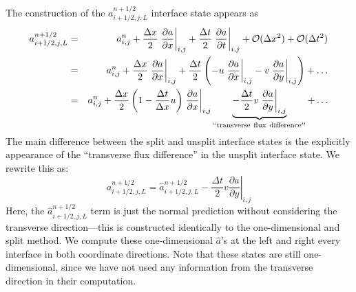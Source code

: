 The construction of the $a_{i+1/2,j,L}^{n+1/2}$ interface state appears as
\begin{eqnarray}
a_{i+1/2,j,L}^{n+1/2} &=& a_{i,j}^n + 
  \frac{\Delta x}{2} \left .\frac{\partial a}{\partial x} \right |_{i,j} + 
  \frac{\Delta t}{2} \left .\frac{\partial a}{\partial t} \right |_{i,j} + 
  \mathcal{O}(\Delta x^2) + \mathcal{O}(\Delta t^2) \nonumber \\
 &=& a_{i,j}^n + 
   \frac{\Delta x}{2} \left .\frac{\partial a}{\partial x} \right |_{i,j} + 
   \frac{\Delta t}{2} \left ( 
   - u \left .\frac{\partial a}{\partial x} \right |_{i,j} 
   - v \left .\frac{\partial a}{\partial y} \right |_{i,j} \right
   ) + \ldots \nonumber \\
    &=& a_{i,j}^n + 
   \frac{\Delta x}{2} \left ( 1 - \frac{\Delta t}{\Delta x} u \right ) 
   \left .\frac{\partial a}{\partial x} \right |_{i,j} \underbrace{-
   \frac{\Delta t}{2} v \left .\frac{\partial a}{\partial y} \right |_{i,j}}_{\mathrm{``transverse~flux~difference''}} +
   \ldots \label{eq:statelu}
\end{eqnarray}
The main difference between the split and unsplit interface states is the
explicitly appearance of the ``transverse flux difference'' in the unsplit
interface state.  We rewrite this as:
\begin{equation}
a_{i+1/2,j,L}^{n+1/2} = \hat{a}_{i+1/2,j,L}^{n+1/2} 
   - \frac{\Delta t}{2} v \left .\frac{\partial a}{\partial y} \right |_{i,j}
\end{equation}
Here, the $\hat{a}_{i+1/2,j,L}^{n+1/2}$ term is just the normal
prediction without considering the transverse direction---this is
constructed identically to the one-dimensional and split method.  We
compute these one-dimensional $\hat{a}$'s at the left and right every
interface in both coordinate directions.  Note that these states are
still one-dimensional, since we have not used any information from the
transverse direction in their computation.  

